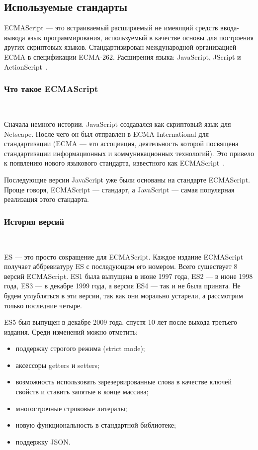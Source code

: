 \subsection{Используемые стандарты}
\label{sec:modeling:ecma}

ECMAScript — это встраиваемый расширяемый не имеющий средств ввода-вывода язык программирования, используемый в качестве основы для построения других скриптовых языков. Стандартизирован международной организацией ECMA в спецификации ECMA-262. Расширения языка: JavaScript, JScript и ActionScript~\cite{wiki_ecma}.

\subsubsection{Что такое ECMAScript}
\

Сначала немного истории. JavaScript создавался как скриптовый язык для Netscape. После чего он был отправлен в ECMA International для стандартизации (ECMA — это ассоциация, деятельность которой посвящена стандартизации информационных и коммуникационных технологий). Это привело к появлению нового языкового стандарта, известного как ECMAScript~\cite{ecma_additional}.

Последующие версии JavaScript уже были основаны на стандарте ECMAScript. Проще говоря, ECMAScript — стандарт, а JavaScript — самая популярная реализация этого стандарта.

\subsubsection{История версий}
\

ES — это просто сокращение для ECMAScript. Каждое издание ECMAScript получает аббревиатуру ES с последующим его номером. Всего существует 8 версий ECMAScript. ES1 была выпущена в июне 1997 года, ES2 — в июне 1998 года, ES3 — в декабре 1999 года, а версия ES4 — так и не была принята. Не будем углубляться в эти версии, так как они морально устарели, а рассмотрим только последние четыре.

ES5 был выпущен в декабре 2009 года, спустя 10 лет после выхода третьего издания. Среди изменений можно отметить:

\begin{itemize}
    \item поддержку строгого режима (strict mode);
    \item аксессоры getters и setters;
    \item возможность использовать зарезервированные слова в качестве ключей свойств и ставить запятые в конце массива;
    \item многострочные строковые литералы;
    \item новую функциональность в стандартной библиотеке;
    \item поддержку JSON.
\end{itemize}

